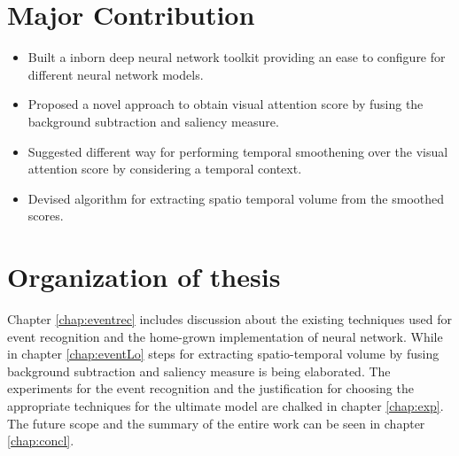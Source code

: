 \section{Major Contribution}
\begin{itemize}
	\item{Built a inborn deep neural network toolkit providing an ease to configure for different neural network models.}
	\item{Proposed a novel approach to obtain visual attention score by fusing the background subtraction and saliency measure.}
	\item{Suggested different way for performing temporal smoothening over the visual attention score by considering a temporal context.}
	\item{Devised algorithm for extracting spatio temporal volume from the smoothed scores.}
\end{itemize}

\section{Organization of thesis}
\par Chapter \ref{chap:eventrec} includes discussion about the existing techniques used for event recognition and the home-grown implementation of neural network. While in chapter \ref{chap:eventLo} steps for extracting spatio-temporal volume by fusing background subtraction and saliency measure is being elaborated. The experiments for the event recognition and the justification for choosing the appropriate techniques for the ultimate model are chalked in chapter \ref{chap:exp}. The future scope and the summary of the entire work can be seen in chapter \ref{chap:concl}.